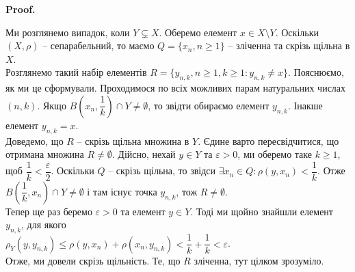\documentclass[a4paper, 10pt]{article}
\makeatletter
\theoremstyle{theoremdd}
\theoremstyle{theoremdd}
\theoremstyle{theoremdd}
\theoremstyle{theoremdd}
\theoremstyle{theoremdd}
\theoremstyle{theoremdd}
\theoremstyle{theoremdd}
\theoremstyle{theoremdd}
\renewenvironment{proof}[1][Proof.\\]{\par
\pushQED{\hfill \qed}%
\normalfont \topsep6\p@\@plus6\p@\relax
\trivlist
\item\relax
{\bfseries
#1\@addpunct{.}}\hspace\labelsep\ignorespaces
}{%
\popQED\endtrivlist\@endpefalse
}
\makeatother
\begin{document}
\begin{proof}
Ми розглянемо випадок, коли $Y \subsetneq X$. Оберемо елемент $x \in X \setminus Y$. Оскільки $(X,\rho)$ -- сепарабельний, то маємо $Q = \{x_n, n \geq 1\}$ -- зліченна та скрізь щільна в $X$.\\
Розглянемо такий набір елементів $R = \{y_{n,k}, n \geq 1, k \geq 1: y_{n,k} \neq x\}$. Пояснюємо, як ми це сформували. Проходимося по всіх можливих парам натуральних числах $(n,k)$. Якщо $B\left(  x_n, \dfrac{1}{k} \right) \cap Y \neq \emptyset$, то звідти обираємо елемент $y_{n,k}$. Інакше елемент $y_{n,k} = x$.\\
Доведемо, що $R$ -- скрізь щільна множина в $Y$. Єдине варто пересвідчитися, що отримана множина $R \neq \emptyset$. Дійсно, нехай $y \in Y$ та $\varepsilon > 0$, ми оберемо таке $k \geq 1$, щоб $\dfrac{1}{k} < \dfrac{\varepsilon}{2}$. Оскільки $Q$ -- скрізь щільна, то звідси $\exists x_n \in Q: \rho(y,x_n) < \dfrac{1}{k}$. Отже $B\left( \dfrac{1}{k},x_n \right) \cap Y \neq \emptyset$ і там існує точка $y_{n,k}$, тож $R \neq \emptyset$.\\
Тепер ще раз беремо $\varepsilon > 0$ та елемент $y \in Y$. Тоді ми щойно знайшли елемент $y_{n,k}$, для якого\\
$\rho_Y(y,y_{n,k}) \leq \rho(y,x_n) + \rho(x_n,y_{n,k}) < \dfrac{1}{k} + \dfrac{1}{k} < \varepsilon$.\\
Отже, ми довели скрізь щільність. Те, що $R$ зліченна, тут цілком зрозуміло.
\end{proof}
\end{document}
